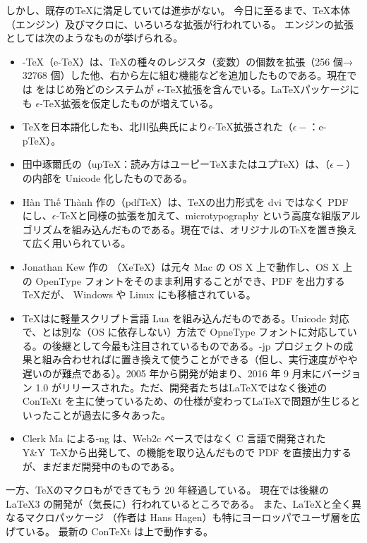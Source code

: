 しかし、既存の\TeX{}に満足していては進歩がない。
今日に至るまで、\TeX{}本体（エンジン）及びマクロに、いろいろな拡張が行われている。
エンジンの拡張としては次のようなものが挙げられる。
\begin{itemize}\setlength{\leftskip}{-1.00zw}%
\item {}-\TeX（e-TeX）は、\TeX{}の種々のレジスタ（変数）の個数を拡張（256 個→ 32768 個）した他、右から左に組む機能などを追加したものである。現在では \pTeX{}をはじめ殆どのシステムが $\epsilon$-\TeX{}拡張を含んでいる。\LaTeX{}パッケージにも $\epsilon$-\TeX{}拡張を仮定したものが増えている。
\item \TeX{}を日本語化した\pTeX{}も、北川弘典{\small 氏}により$\epsilon$-\TeX{}拡張された（$\epsilon-$\pTeX：e-pTeX）。
\item 田中琢爾{\small 氏}の\upTeX（upTeX：読み方はユーピー\TeX{}またはユプ\TeX）は、（$\epsilon-$）\pTeX{}の内部を Unicode 化したものである。
\item H\`{a}n Th\'{\^{e}} Th\`{a}nh 作の\pdfTeX（pdfTeX）は、\TeX{}の出力形式を dvi ではなく PDF にし、$\epsilon$-\TeX{}と同様の拡張を加えて、microtypography という高度な組版アルゴリズムを組み込んだものである。現在では、オリジナルの\TeX{}を置き換えて広く用いられている。
\item Jonathan Kew 作の （XeTeX）は元々 Mac の OS X 上で動作し、OS X 上の OpenType フォントをそのまま利用することができ、PDF を出力する\TeX{}だが、 Windows や Linux にも移植されている。
\item {}\TeX{}は\pdfTeX{}に軽量スクリプト言語 Lua を組み込んだものである。Unicode 対応で、\XeTeX{}とは別な（OS に依存しない）方法で OpneType フォントに対応している。\pdfTeX{}の後継として今最も注目されているものである。\LuaTeX{}-jp プロジェクトの成果と組み合わせれば\pTeX{}に置き換えて使うことができる（但し、実行速度がやや遅いのが難点である）。2005 年から開発が始まり、2016 年 9 月末にバージョン 1.0 がリリースされた。ただ、開発者たちは\LaTeX{}ではなく後述の Con\TeX{}t を主に使っているため、\LuaTeX{}の仕様が変わって\LaTeX{}で問題が生じるといったことが過去に多々あった。
\item Clerk Ma による\pTeX{}-ng は、Web2c ベースではなく C 言語で開発された Y\&Y~\TeX{}から出発して\pTeX、\upTeX{}の機能を取り込んだもので PDF を直接出力するが、まだまだ開発中のものである。
\end{itemize}
一方、\TeX{}のマクロも\LaTeXe{}ができてもう 20 年経過している。
現在では\LaTeXe{}後継の\LaTeX{}3 の開発が（気長に）行われているところである。
また、\LaTeX{}と全く異なるマクロパッケージ （作者は Hans Hagen）も特にヨーロッパでユーザ層を広げている。
最新の Con\TeX{}t は\LuaTeX{}上で動作する。\\

